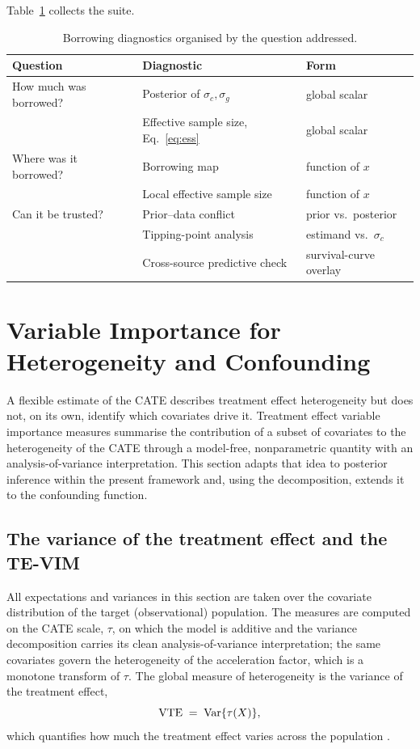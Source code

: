 Table~\ref{tab:diag} collects the suite.

\begin{table}[t]
\centering
\caption{Borrowing diagnostics organised by the question addressed.}
\label{tab:diag}
\begin{tabular}{@{}lll@{}}
\toprule
Question & Diagnostic & Form \\
\midrule
How much was borrowed?
  & Posterior of $\sigma_c, \sigma_g$ & global scalar \\
  & Effective sample size, Eq.~\eqref{eq:ess} & global scalar \\[2pt]
Where was it borrowed?
  & Borrowing map & function of $x$ \\
  & Local effective sample size & function of $x$ \\[2pt]
Can it be trusted?
  & Prior--data conflict & prior vs.\ posterior \\
  & Tipping-point analysis & estimand vs.\ $\sigma_c$ \\
  & Cross-source predictive check & survival-curve overlay \\
\bottomrule
\end{tabular}
\end{table}

\section{Variable Importance for Heterogeneity and Confounding}
\label{sec:pi-vim}

A flexible estimate of the CATE describes treatment effect heterogeneity but
does not, on its own, identify which covariates drive it. Treatment effect
variable importance measures \citep{hines2022} summarise the contribution of a
subset of covariates to the heterogeneity of the CATE through a model-free,
nonparametric quantity with an analysis-of-variance interpretation. This section
adapts that idea to posterior inference within the present framework and, using
the decomposition, extends it to the confounding function.

\subsection{The variance of the treatment effect and the TE-VIM}

All expectations and variances in this section are taken over the covariate
distribution of the target (observational) population. The measures are computed
on the CATE scale, $\tau$, on which the model is additive and the
variance decomposition carries its clean analysis-of-variance interpretation;
the same covariates govern the heterogeneity of the acceleration factor, which
is a monotone transform of $\tau$. The global measure of heterogeneity is the
variance of the treatment effect,
\begin{equation}
\label{eq:vte}
\mathrm{VTE} \;=\; \mathrm{Var}\{\tau(X)\},
\end{equation}
which quantifies how much the treatment effect varies across the population
\citep{levy2021}.

